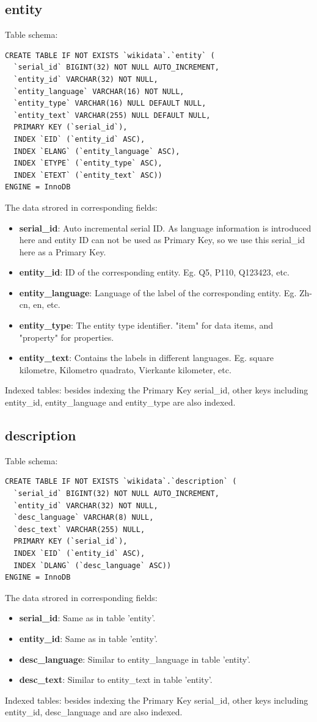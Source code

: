 \documentclass[12pt]{article}
\begin{document}
\subsection{entity}
Table schema:
\lstset{language=SQL}
\begin{lstlisting}
CREATE TABLE IF NOT EXISTS `wikidata`.`entity` (
  `serial_id` BIGINT(32) NOT NULL AUTO_INCREMENT,
  `entity_id` VARCHAR(32) NOT NULL,
  `entity_language` VARCHAR(16) NOT NULL,
  `entity_type` VARCHAR(16) NULL DEFAULT NULL,
  `entity_text` VARCHAR(255) NULL DEFAULT NULL,
  PRIMARY KEY (`serial_id`),
  INDEX `EID` (`entity_id` ASC),
  INDEX `ELANG` (`entity_language` ASC),
  INDEX `ETYPE` (`entity_type` ASC),
  INDEX `ETEXT` (`entity_text` ASC))
ENGINE = InnoDB
\end{lstlisting}
The data strored in corresponding fields:
\begin{itemize}
\item \textbf{serial\_id}: Auto incremental serial ID. As language information is introduced here and entity ID can not be used as Primary Key, so we use this serial\_id here as a Primary Key.
\item \textbf{entity\_id}: ID of the corresponding entity. Eg. Q5, P110, Q123423, etc.
\item \textbf{entity\_language}: Language of the label of the corresponding entity. Eg. Zh-cn, en, etc.
\item \textbf{entity\_type}: The entity type identifier. "item" for data items, and "property" for properties.
\item \textbf{entity\_text}: Contains the labels in different languages. Eg. square kilometre, Kilometro quadrato, Vierkante kilometer, etc.
\end{itemize}
Indexed tables: besides indexing the Primary Key serial\_id, other keys including entity\_id, entity\_language and entity\_type are also indexed.
\subsection{description}
\lstset{language=SQL}
Table schema:
\begin{lstlisting}
CREATE TABLE IF NOT EXISTS `wikidata`.`description` (
  `serial_id` BIGINT(32) NOT NULL AUTO_INCREMENT,
  `entity_id` VARCHAR(32) NOT NULL,
  `desc_language` VARCHAR(8) NULL,
  `desc_text` VARCHAR(255) NULL,
  PRIMARY KEY (`serial_id`),
  INDEX `EID` (`entity_id` ASC),
  INDEX `DLANG` (`desc_language` ASC))
ENGINE = InnoDB
\end{lstlisting}
The data strored in corresponding fields:
\begin{itemize}
\item \textbf{serial\_id}: Same as in table 'entity'.
\item \textbf{entity\_id}: Same as in table 'entity'.
\item \textbf{desc\_language}: Similar to entity\_language in table 'entity'.
\item \textbf{desc\_text}: Similar to entity\_text in table 'entity'.
\end{itemize}
Indexed tables: besides indexing the Primary Key serial\_id, other keys including entity\_id, desc\_language and are also indexed.
\end{document}
